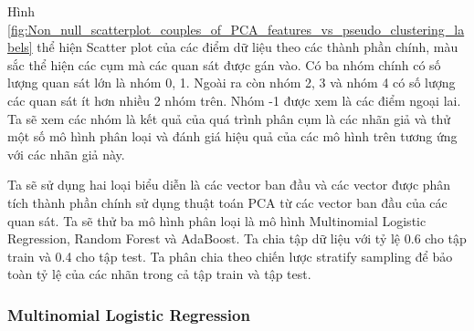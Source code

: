 Hình \ref{fig:Non_null_scatterplot_couples_of_PCA_features_vs_pseudo_clustering_labels} thể hiện Scatter plot của các điểm dữ liệu theo các thành phần chính, màu sắc thể hiện các cụm mà các quan sát được gán vào.
Có ba nhóm chính có số lượng quan sát lớn là nhóm 0, 1.
Ngoài ra còn nhóm 2, 3 và nhóm 4 có số lượng các quan sát ít hơn nhiều 2 nhóm trên.
Nhóm -1 được xem là các điểm ngoại lai.
Ta sẽ xem các nhóm là kết quả của quá trình phân cụm là các nhãn giả và thử một số mô hình phân loại và đánh giá hiệu quả của các mô hình trên tương ứng với các nhãn giả này.

Ta sẽ sử dụng hai loại biểu diễn là các vector ban đầu và các vector được phân tích thành phần chính sử dụng thuật toán PCA từ các vector ban đầu của các quan sát.
Ta sẽ thử ba mô hình phân loại là mô hình Multinomial Logistic Regression, Random Forest và AdaBoost.
Ta chia tập dữ liệu với tỷ lệ 0.6 cho tập train và 0.4 cho tập test.
Ta phân chia theo chiến lược stratify sampling để bảo toàn tỷ lệ của các nhãn trong cả tập train và tập test.


\subsubsection{Multinomial Logistic Regression}

